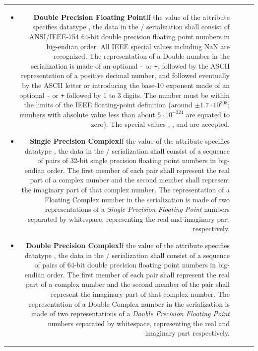 \begin{tabular}{RRCp{0.8\textwidth}}
\begin{center}
{\begin{itemize}
\item {\bf Double Precision Floating Point}\quad If
the value of the {}
attribute specifies datatype {},
the data in the / serialization shall consist of ANSI/IEEE-754
64-bit double precision floating point numbers in big-endian order. 
All IEEE special values including NaN are recognized.
The representation of a Double number in the 
 serialization is made of an optional {\tt-} or {\tt+},
followed by the ASCII representation of a positive decimal number,
and followed eventually by the ASCII letter  or  
introducing the base-10 exponent made of an optional {\tt-} or {\tt+}
followed by 1 to 3 digits. The number must be within the limits of the
IEEE floating-point definition (around $\pm1.7\cdot10^{308}$; numbers with
absolute value less than about $5\cdot10^{-324}$ are equated to zero).
The special
values , , and  are accepted.

\item {\bf Single Precision Complex}\quad If the value of the {}
attribute specifies datatype {},
the data in the / serialization shall consist of a sequence of 
pairs of 32-bit single precision floating point numbers in big-endian order. 
The first member of each
pair shall represent the real part of a complex number and the
second member shall represent the imaginary part of that complex
number.
The representation of a Floating Complex number in the 
 serialization is made of two representations
of a {\em  Single Precision Floating Point} numbers separated by 
whitespace, representing the real and imaginary part respectively.

\item {\bf Double Precision Complex}\quad If the
value of the {}
attribute specifies datatype {},
the data in the / serialization  shall consist of a
sequence of pairs of 64-bit double precision floating point numbers
in big-endian order.
The first member of each pair shall represent the real part of a
complex number and the second member of the pair shall represent the
imaginary part of that complex number.
The representation of a Double Complex number in the 
 serialization is made of two representations
of a {\em  Double Precision Floating Point} numbers separated by 
whitespace, representing the real and imaginary part respectively.
\end{itemize}


}
\end{center}
\end{tabular}
